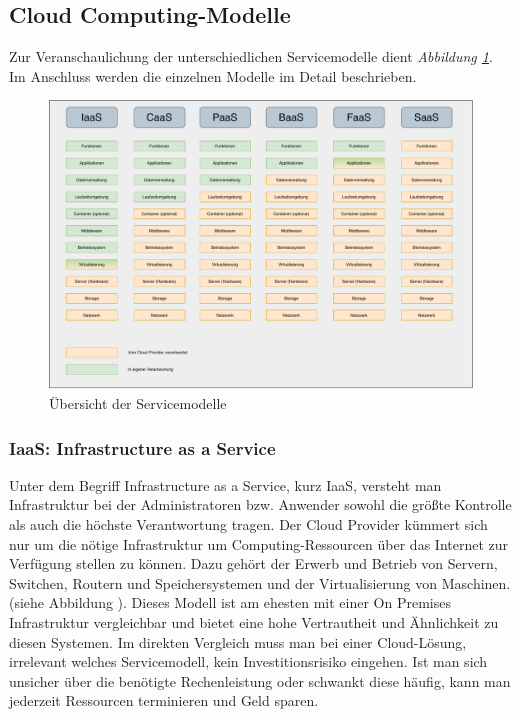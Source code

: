 \clearpage

\subsection{Cloud Computing-Modelle}
\label{Servicemodelle}
Zur Veranschaulichung der unterschiedlichen Servicemodelle dient \textit{Abbildung \ref{fig:Servicemodelle}}.
Im Anschluss werden die einzelnen Modelle im Detail beschrieben.


\begin{figure}[htbp]
    \centering
    \includegraphics[width=1.0\textwidth]{30-Serverless-Theorie/ServiceModelle.pdf}
    \caption{Übersicht der Servicemodelle}
    \label{fig:Servicemodelle}
\end{figure}


   \subsubsection{IaaS: Infrastructure as a Service}
   Unter dem Begriff Infrastructure as a Service, kurz IaaS, versteht man Infrastruktur bei der Administratoren bzw. Anwender sowohl die größte Kontrolle als auch die höchste Verantwortung tragen.
   Der Cloud Provider kümmert sich nur um die nötige Infrastruktur um Computing-Ressourcen über das Internet zur Verfügung stellen zu können.
   Dazu gehört der Erwerb und Betrieb von Servern, Switchen, Routern und Speichersystemen und der Virtualisierung von Maschinen.(siehe Abbildung \textit{}).
   Dieses Modell ist am ehesten mit einer On Premises Infrastruktur vergleichbar und bietet eine hohe Vertrautheit und Ähnlichkeit zu diesen Systemen.
   Im direkten Vergleich muss man bei einer Cloud-Lösung, irrelevant welches Servicemodell, kein Investitionsrisiko eingehen.
   Ist man sich unsicher über die benötigte Rechenleistung oder schwankt diese häufig, kann man jederzeit Ressourcen terminieren und Geld sparen.

